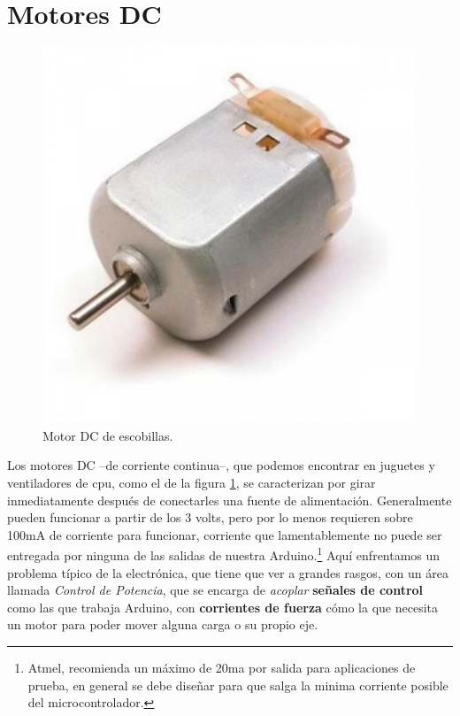 \documentclass[letterpaper, 10pt]{report}
\begin{document}
\section{Motores DC}

\begin{figure}[h]
\centering
\includegraphics[scale=0.1]{motorDC.jpg}
\caption{Motor DC de escobillas.\label{motorDC}}
\end{figure}

Los motores DC --de corriente continua--, que podemos encontrar en juguetes y ventiladores de cpu, como el de la figura \ref{motorDC}, se caracterizan por girar inmediatamente después de conectarles una fuente de alimentación. Generalmente pueden funcionar a partir de los 3 volts, pero por lo menos requieren sobre 100mA de corriente para funcionar, corriente que lamentablemente no puede ser entregada por ninguna de las salidas de nuestra Arduino.\footnote{Atmel, recomienda un máximo de 20ma por salida para aplicaciones de prueba, en general se debe diseñar para que salga la minima corriente posible del microcontrolador.} Aquí enfrentamos un problema típico de la electrónica, que tiene que ver a grandes rasgos, con un área llamada \emph{Control de Potencia}, que se encarga de  \emph{acoplar} \textbf{señales de control} como las que trabaja Arduino, con \textbf{corrientes de fuerza} cómo la que necesita un motor para poder mover alguna carga o su propio eje.
\end{document}
